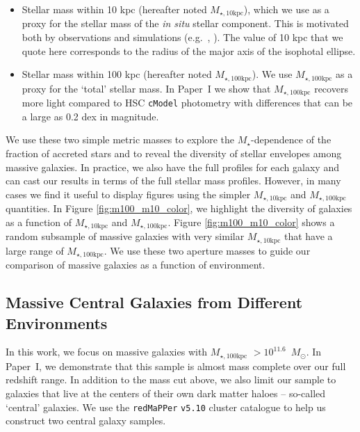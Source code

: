 \documentclass[a4paper,fleqn,usenatbib]{mnras}
\def\msun{$M_\odot$}
\def\redm{\texttt{redMaPPer}}
\def\cmodel{\texttt{cModel}}
\def\mstar{{$M_{\star}$}}
\def\minn{{$M_{\star,10\mathrm{kpc}}$}}
\def\mtot{{$M_{\star,100\mathrm{kpc}}$}}
\begin{document}
    \begin{itemize}
    
        \item Stellar mass within 10 kpc (hereafter noted \minn{}), which we use 
            as a proxy for the stellar mass of the \textit{in situ} stellar 
            component. 
            This is motivated both by observations and simulations 
            (e.g.~\citealt{vanDokkum2010}, \citealt{RodriguezGomez2016}). 
            The value of 10 kpc that we quote here corresponds to the radius of the 
            major axis of the isophotal ellipse.
            
        \item Stellar mass within 100 kpc (hereafter noted \mtot{}). 
            We use \mtot{} as a proxy for the `total' stellar mass. 
            In Paper~I we show that \mtot{} recovers more light compared to 
            HSC \cmodel{} photometry with differences that can be a large as 0.2 dex 
            in magnitude.        
               
   \end{itemize}
   
   We use these two simple metric masses to explore the \mstar{}-dependence of the 
   fraction of accreted stars and to reveal the diversity of stellar envelopes among 
   massive galaxies. 
   In practice, we also have the full profiles for each galaxy and can cast our 
   results in terms of the full stellar mass profiles. 
   However, in many cases we find it useful to display figures using the simpler 
   \minn{} and \mtot{} quantities. 
   In Figure \ref{fig:m100_m10_color}, we highlight the diversity of galaxies as a 
   function of \minn{} and \mtot{}. 
   Figure \ref{fig:m100_m10_color} shows a random subsample of massive galaxies with 
   very similar \minn{} that have a large range of \mtot{}. 
   We use these two aperture masses to guide our comparison of massive galaxies 
   as a function of environment.  
    
\subsection{Massive Central Galaxies from Different Environments}
    \label{ssec:cen}
         
    In this work, we focus on massive galaxies with \mtot{} $>10^{11.6}$~\msun{}. 
    In Paper~I, we demonstrate that this sample is almost mass complete over our full 
    redshift range. 
    In addition to the mass cut above, we also limit our sample to galaxies that live 
    at the centers of their own dark matter haloes -- so-called `central' galaxies. 
    We use the \redm{} \texttt{v5.10} \citep{Rykoff2014, Rozo2015b} cluster catalogue 
    to help us construct two central galaxy samples.
    
\end{document}
